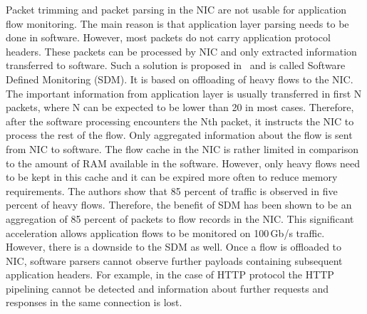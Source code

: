 Packet trimming and packet parsing in the NIC are not usable for application flow monitoring. The main reason is that application layer parsing needs to be done in software. However, most packets do not carry application protocol headers. These packets can be processed by NIC and only extracted information transferred to software. Such a solution is proposed in~\cite{Kekely-2016-Software} and is called Software Defined Monitoring (SDM). It is based on offloading of heavy flows to the NIC. The important information from application layer is usually transferred in first N packets, where N can be expected to be lower than 20 in most cases. Therefore, after the software processing encounters the Nth packet, it instructs the NIC to process the rest of the flow. Only aggregated information about the flow is sent from NIC to software. The flow cache in the NIC is rather limited in comparison to the amount of RAM available in the software. However, only heavy flows need to be kept in this cache and it can be expired more often to reduce memory requirements. The authors show that 85 percent of traffic is observed in five percent of heavy flows. Therefore, the benefit of SDM has been shown to be an aggregation of 85 percent of packets to flow records in the NIC. This significant acceleration allows application flows to be monitored on 100\,Gb/s traffic. However, there is a downside to the SDM as well. Once a flow is offloaded to NIC, software parsers cannot observe further payloads containing subsequent application headers. For example, in the case of HTTP protocol the HTTP pipelining cannot be detected and information about further requests and responses in the same connection is lost.

